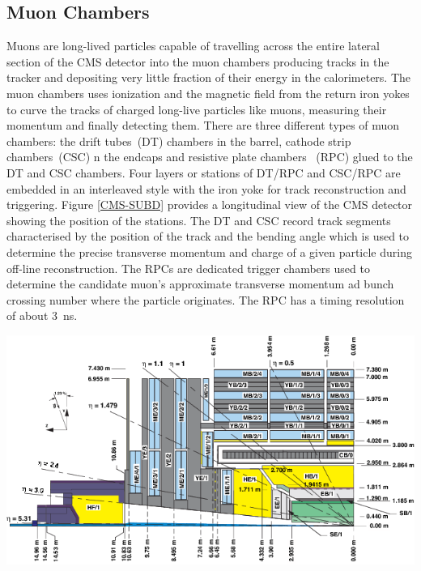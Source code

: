 \subsection{Muon Chambers}
Muons are long-lived particles capable of travelling across the entire lateral section of the CMS detector into the muon chambers producing tracks in the tracker and depositing very little fraction of their energy in the calorimeters. The muon chambers uses ionization and the magnetic field from the return iron yokes to curve the tracks of charged long-live particles like muons, measuring their momentum and finally detecting them. There are three different types of muon chambers: the drift tubes~(DT) chambers in the barrel, cathode strip chambers~(CSC) n the endcaps and resistive plate chambers ~(RPC) glued to the DT and CSC chambers. Four layers or stations of DT/RPC and CSC/RPC are embedded in an interleaved  style with the iron yoke for track reconstruction and triggering. Figure \eqref{CMS-SUBD} provides a longitudinal view of the CMS detector showing the position of the stations.
The DT and CSC record track segments characterised by the position of the track and the bending angle which is used to determine the precise transverse momentum and charge of a given particle during off-line reconstruction. The RPCs are dedicated trigger chambers used to determine the candidate muon's approximate transverse momentum ad bunch crossing number where the particle originates. The RPC has a timing resolution of about 3~ns.

\begin{center}\label{CMS-SUBD}
\centering
\mbox{\includegraphics[scale=0.6]{THESISPLOTS/CMS_Int_View.png}} 
\label{fig:CMS Detector Longitudinal view.}
\end{center}

